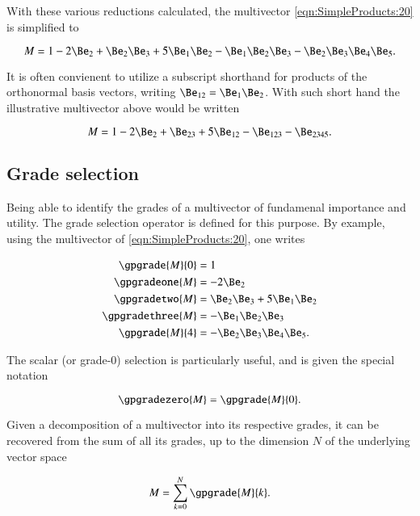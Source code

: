 With these various reductions calculated, the multivector \cref{eqn:SimpleProducts:20} is simplified to

\begin{dmath}\label{eqn:SimpleProducts:120}
M = 1 - 2 \Be_2  + \Be_2 \Be_3 + 5 \Be_1 \Be_2 - \Be_1 \Be_2 \Be_3 -\Be_2 \Be_3 \Be_4 \Be_5.
\end{dmath}

It is often convienent to utilize a subscript shorthand for products of the orthonormal basis vectors, writing \( \Be_{12} = \Be_1 \Be_2 \).  With such short hand the illustrative multivector above would be written

\begin{dmath}\label{eqn:SimpleProducts:130}
M = 1 - 2 \Be_2  + \Be_{23} + 5 \Be_{12} - \Be_{123} -\Be_{2345}.
\end{dmath}

\subsection{Grade selection}

Being able to identify the grades of a multivector of fundamenal importance and utility.  The grade
selection operator is defined for this purpose.
By example, using the multivector of \cref{eqn:SimpleProducts:20}, one writes

\begin{dmath}\label{eqn:SimpleProducts:140}
\begin{aligned}
   \gpgrade{M}{0} &= 1 \\
   \gpgradeone{M} &= - 2 \Be_2 \\
   \gpgradetwo{M} &= \Be_2 \Be_3 + 5 \Be_1 \Be_2 \\
   \gpgradethree{M} &= - \Be_1 \Be_2 \Be_3 \\
   \gpgrade{M}{4} &= -\Be_2 \Be_3 \Be_4 \Be_5.
\end{aligned}
\end{dmath}

The scalar (or grade-0) selection is particularly useful, and is given the special notation

\begin{dmath}\label{eqn:SimpleProducts:180}
\gpgradezero{M} = \gpgrade{M}{0}.
\end{dmath}

Given a decomposition of a multivector into its respective grades, it can be recovered from the sum of all its grades, up to the dimension \( N \) of the underlying vector space

\begin{dmath}\label{eqn:SimpleProducts:160}
   M = \sum_{k = 0}^N \gpgrade{M}{k}.
\end{dmath}
